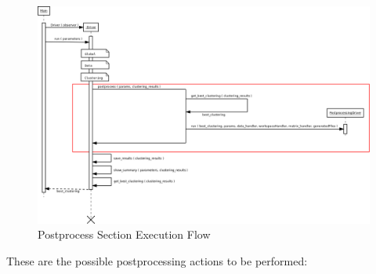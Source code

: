 \begin{landscape}
\begin{figure}
\includegraphics[width=24cm]{img/postprocess_sequence_driver.png}
\caption{Postprocess Section Execution Flow}
\end{figure}
\end{landscape}


\label{subsec:postprocess:params}
These are the possible postprocessing actions to be performed:


